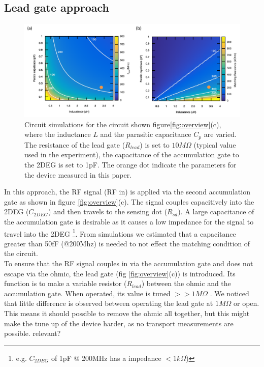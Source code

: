 \documentclass{article}
\begin{document}
\subsection{Lead gate approach} %
	\label{sub:lead_gate_approach}
	\begin{figure}
		\includegraphics[width=\textwidth]{Illustrations/Theory_figure/theory_delft_v3.pdf}
		\caption{Circuit simulations for the circuit shown figure\ref{fig:overview}(c), where the inductance $L$ and the parasitic capacitance $C_p$ are varied. The resistance of the lead gate ($R_{lead}$) is set to $10M\Omega$ (typical value used in the experiment), the capacitance of the accumulation gate to the 2DEG is set to 1pF. The orange dot indicate the parameters for the device measured in this paper.}
		\label{fig:lead_gate_theory}
	\end{figure}
	In this approach, the RF signal (RF in) is applied via the second accumulation gate as shown in figure \ref{fig:overview}(c). The signal couples capacitively into the 2DEG ($C_{2DEG}$) and then travels to the sensing dot ($R_{sd}$). A large capacitance of the accumulation gate is desirable as it causes a low impedance for the signal to travel into the 2DEG \footnote{e.g. $C_{2DEG}$ of 1pF @ 200MHz has a impedance $< 1k\Omega$)}. From simulations we estimated that a capacitance greater than 50fF (@200Mhz) is needed to not effect the matching condition of the circuit.
	\\
	To ensure that the RF signal couples in via the accumulation gate and does not escape via the ohmic, the lead gate (fig \ref{fig:overview}(c)) is introduced.
	Its function is to make a variable resistor ($R_{lead}$) between the ohmic and the accumulation gate.
	When operated, its value is tuned $>>1M\Omega$ . We noticed that little difference is observed between operating the lead gate at $1M\Omega$ or open. This means it should possible to remove the ohmic all together, but this might make the tune up of the device harder, as no transport measurements are possible. \color{blue}relevant?\color{black}
\end{document}
